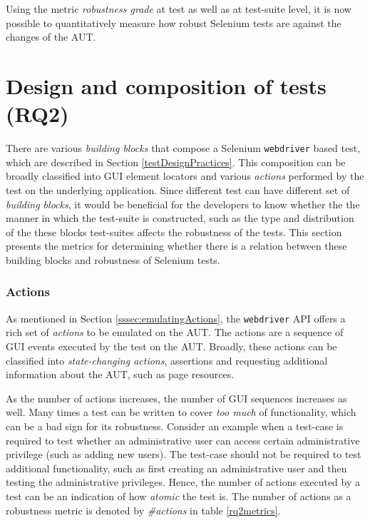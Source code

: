 Using the metric \textit{robustness grade} at test as well as at test-suite level, it is now possible to quantitatively measure how robust Selenium tests are against the changes of the AUT.

\section{Design and composition of tests (RQ2)}
\label{robfactors}
There are various \textit{building blocks} that compose a Selenium \texttt{webdriver} based test, which are described in Section \ref{testDesignPractices}. This composition can be broadly classified into GUI element locators and various \textit{actions} performed by the test on the underlying application. Since different test can have different set of \textit{building blocks}, it would be beneficial for the developers to know whether the the manner in which the test-suite is constructed, such as the type and distribution of the these blocks test-suites affects the robustness of the tests. This section presents the metrics for determining whether there is a relation between these building blocks and robustness of Selenium tests.  

\subsubsection*{Actions}
As mentioned in Section \ref{sssec:emulatingActions}, the \texttt{webdriver} API offers a rich set of \textit{actions} to be emulated on the AUT. The actions are a sequence of GUI events executed by the test on the AUT. Broadly, these actions can be classified into \textit{state-changing actions}, assertions and requesting additional information about the AUT, such as page resources. 

As the number of actions increases, the number of GUI sequences increases as well. Many times a test can be written to cover \textit{too much} of functionality, which can be a bad sign for its robustness. Consider an example when a test-case is required to test whether an administrative user can access certain administrative privilege (such as adding new users). The test-case should not be required to test additional functionality, such as first creating an administrative user and then testing the administrative privileges. Hence, the number of actions executed by a test can be an indication of how \textit{atomic} the test is. The number of actions as a robustness metric is denoted by \textit{\#actions} in table \ref{rq2metrics}. 

